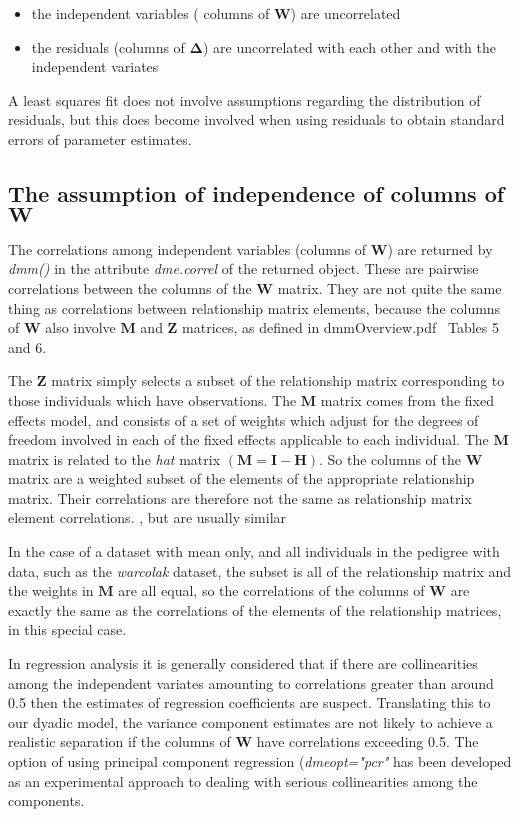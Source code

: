 \documentclass[titlepage,a4paper,12pt]{article}  %
\begin{document}
\begin{itemize}
\item the independent variables ( columns of $\bm{W}$) are uncorrelated
\item the residuals (columns of $\bm{\Delta}$) are uncorrelated with each other and with the independent variates
\end{itemize}

A least squares fit does not involve assumptions regarding the distribution of residuals, but this does become involved when using residuals to obtain standard errors of parameter estimates.

\subsection{The assumption of independence of columns of $\bm{W}$}

The correlations among independent variables (columns of $\bm{W}$) are returned by {\em dmm()} in the attribute {\em dme.correl} of the returned object.  These are pairwise correlations between the columns of the $\bm{W}$ matrix. They are not quite the same thing as correlations between relationship matrix elements, because the columns of $\bm{W}$ also involve $\bm{M}$ and $\bm{Z}$ matrices, as defined in dmmOverview.pdf~\cite{jack:15} Tables 5 and 6.

The $\bm{Z}$ matrix simply selects a subset of the relationship matrix corresponding to those individuals which have observations. The $\bm{M}$ matrix comes from the fixed effects model, and consists of a set of weights which adjust for the degrees of freedom involved in each of the fixed effects applicable to each individual. The $\bm{M}$ matrix is related to the {\em hat} matrix $(\bm{M} = \bm{I} - \bm{H})$. So the columns of the $\bm{W}$ matrix are a weighted subset of the elements of the appropriate relationship matrix. Their correlations are therefore not the same as relationship matrix element correlations.
, but are usually similar

In the case of a dataset with mean only, and all individuals in the pedigree with data, such as the {\em warcolak} dataset, the subset is all of the relationship matrix and the weights in $\bm{M}$ are all equal, so the correlations of the columns of $\bm{W}$ are exactly the same as the correlations of the elements of the relationship matrices, in this special case.

In regression analysis it is generally considered that if there are collinearities among the independent variates amounting to correlations greater than around 0.5 then the estimates of regression coefficients are suspect. Translating this to our dyadic model, the variance component estimates are not likely to achieve a realistic separation if the columns of $\bm{W}$ have correlations exceeding 0.5. The option of using principal component regression ({\em dmeopt="pcr"} has been developed as an experimental approach to dealing with serious collinearities among the components.
\end{document}
